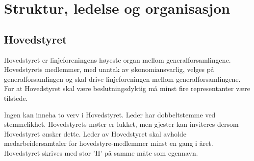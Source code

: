 \chapter{Struktur, ledelse og organisasjon}
\section{Hovedstyret} 
Hovedstyret er linjeforeningens høyeste organ mellom generalforsamlingene. Hovedstyrets medlemmer, med unntak av økonomiansvarlig, velges på generalforsamlingen og skal drive linjeforeningen mellom generalforsamlingene. For at Hovedstyret skal være beslutningsdyktig må minst fire representanter være tilstede. \newline

Ingen kan inneha to verv i Hovedstyret. Leder har dobbeltstemme ved stemmelikhet. Hovedstyrets møter er lukket, men gjester kan inviteres dersom Hovedstyret ønsker \linebreak dette. Leder av Hovedstyret skal avholde medarbeidersamtaler for hovedstyre-\linebreak medlemmer minst en gang i året. Hovedstyret skrives med stor 'H' på samme måte som egennavn.




